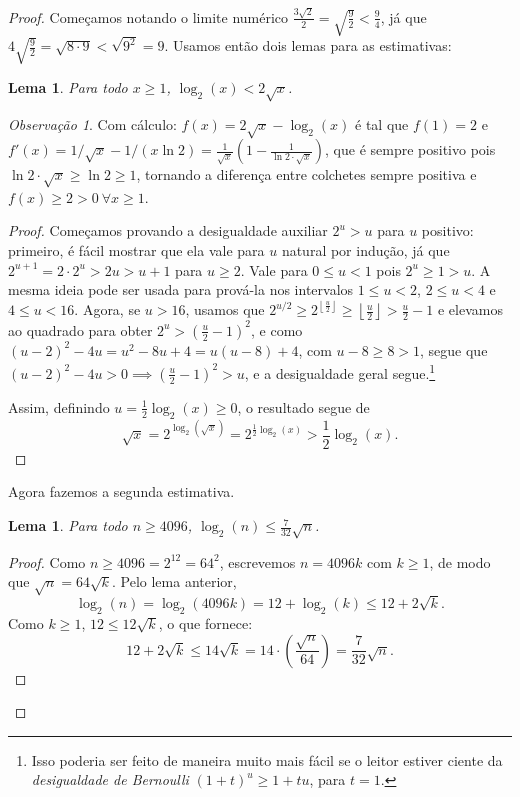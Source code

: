 \documentclass[11pt]{article}
\newtheorem{lemma}[theorem]{Lema}
\theoremstyle{remark}
\newtheorem{remark}[theorem]{Observação}
\newcommand{\floor}[1]{\left\lfloor #1 \right\rfloor}
\begin{document}
\begin{proof}
    
    Começamos notando o limite numérico $\frac{3\sqrt{2}}{2} = \sqrt{\frac{9}{2}} < \frac{9}{4}$, já que $4\sqrt{\frac92}=\sqrt{8\cdot 9}<\sqrt{9^2}=9$. Usamos então dois lemas para as estimativas:
    
    \begin{lemma}
    Para todo $x \ge 1$, $\log_2(x) < 2\sqrt{x}$.
    \end{lemma}
    \begin{remark}
        Com cálculo: $f(x)= 2\sqrt{x}-\log_2(x)$ é tal que $f(1)=2$ e $f'(x)=1/\sqrt{x}-1/(x\ln 2)=\frac{1}{\sqrt{x}}(1-\frac{1}{\ln 2\cdot \sqrt{x}})$, que é sempre positivo pois $\ln2\cdot \sqrt{x}\ge \ln 2\ge 1$, tornando a diferença entre colchetes sempre positiva e $f(x)\ge 2>0\ \forall x\ge 1$.
    \end{remark}
    \begin{proof}
    Começamos provando a desigualdade auxiliar $2^u >u$ para $u$ positivo: primeiro, é fácil mostrar que ela vale para $u$ natural por indução, já que $2^{u+1}= 2\cdot 2^u>2u>u+1$ para $u\ge 2$. Vale para $0\le u<1$ pois $2^u\ge 1>u$. A mesma ideia pode ser usada para prová-la nos intervalos $1\le u<2$, $2\le u<4$ e $4\le u<16$. Agora, se $u>16$, usamos que $2^{u/2}\ge 2^{\floor{\frac{u}{2}}}\ge \floor{\frac u2}>\frac{u}{2}-1$ e elevamos ao quadrado para obter $2^u> (\frac{u}{2}-1)^2$, e como $(u-2)^2-4u = u^2 - 8u +4 = u(u-8)+4$, com $u-8\ge 8>1$, segue que $(u-2)^2-4u>0\implies (\frac{u}2-1)^2>u$, e a desigualdade geral segue.\footnote{Isso poderia ser feito de maneira muito mais fácil se o leitor estiver ciente da \textit{desigualdade de Bernoulli} $(1+t)^u\ge 1+tu$, para $t = 1$.}
    
    Assim, definindo $u = \frac{1}{2}\log_2(x) \ge 0$, o resultado segue de
    \[
    \sqrt{x}=2^{\log_2(\sqrt{x})}=2^{\frac{1}{2}\log_2(x)} > \frac{1}{2}\log_2(x).
    \]
    \end{proof}

    Agora fazemos a segunda estimativa.
    \begin{lemma}
    Para todo $n \ge 4096$, $\log_2(n) \le \frac{7}{32}\sqrt{n}$.
    \end{lemma}
    \begin{proof}
    Como $n \ge 4096 = 2^{12}=64^2$, escrevemos $n = 4096k$ com $k \ge 1$, de modo que $\sqrt{n} = 64\sqrt{k}$. Pelo lema anterior,
    \[
    \log_2(n) = \log_2(4096k) = 12 + \log_2(k) \le 12 + 2\sqrt{k}.
    \]
    Como $k \ge 1$, $12 \le 12\sqrt{k}$, o que fornece:
    \[
    12 + 2\sqrt{k} \le 14\sqrt{k} = 14 \cdot \left(\frac{\sqrt{n}}{64}\right) = \frac{7}{32}\sqrt{n}.
    \]
    \end{proof}
    

\end{proof}
\end{document}
